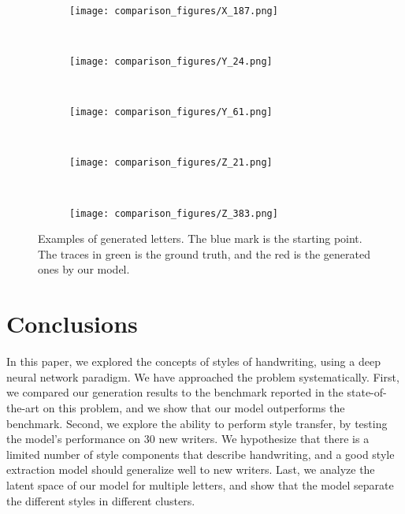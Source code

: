 \documentclass[conference]{IEEEtran}
\begin{document}
\begin{figure*}[!htbp]
    ~
    \begin{subfigure}[b]{0.15\textwidth}
        \texttt{[image: comparison\_figures/X\_187.png]}
    \end{subfigure}
    ~
    \begin{subfigure}[b]{0.15\textwidth}
        \texttt{[image: comparison\_figures/Y\_24.png]}
    \end{subfigure}
    ~
    \begin{subfigure}[b]{0.15\textwidth}
        \texttt{[image: comparison\_figures/Y\_61.png]}
    \end{subfigure}
    ~
    \begin{subfigure}[b]{0.15\textwidth}
        \texttt{[image: comparison\_figures/Z\_21.png]}
    \end{subfigure}
    ~
    \begin{subfigure}[b]{0.15\textwidth}
        \texttt{[image: comparison\_figures/Z\_383.png]}
    \end{subfigure}
    \caption{Examples of generated letters. The blue mark is the starting point. The traces in green is the ground truth, and the red is the generated ones by our model.}
    \label{fig:letters_examples}
\end{figure*}


\section{Conclusions}
\par In this paper, we explored the concepts of styles of handwriting, using a deep  neural network paradigm. We have approached the problem systematically. First, we compared our generation results to the benchmark reported in the state-of-the-art on this problem, and we show that our model outperforms the benchmark. Second, we explore the ability to perform style transfer, by testing the model's performance on 30 new writers. We hypothesize that there is a limited number of style components that describe handwriting, and a good style extraction model should generalize well to new writers. Last, we analyze the latent space of our model for multiple letters, and show that the model separate the different styles in different clusters. 
\end{document}
